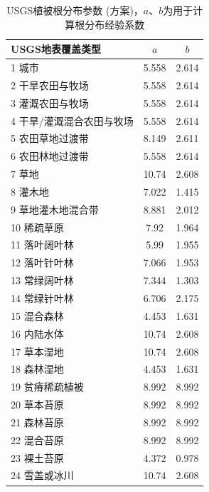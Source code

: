 \begin{table}[htbp]
\centering
\caption[USGS植被根分布参数 (\citet{zeng2001global}方案)]{USGS植被根分布参数 (\citet{zeng2001global}方案)，$a$、$b$为用于计算根分布经验系数}
\label{tab:USGS植被根分布参数}
\begin{tabular}{@{}lcc@{}}
\toprule
USGS地表覆盖类型     & $a$ & $b$ \\ \midrule
1 城市           & 5.558      & 2.614      \\
2 干旱农田与牧场      & 5.558      & 2.614      \\
3 灌溉农田与牧场      & 5.558      & 2.614      \\
4 干旱/灌溉混合农田与牧场 & 5.558      & 2.614      \\
5 农田草地过渡带      & 8.149      & 2.611      \\
6 农田林地过渡带      & 5.558      & 2.614      \\
7 草地           & 10.74      & 2.608      \\
8 灌木地          & 7.022      & 1.415      \\
9 草地灌木地混合带     & 8.881      & 2.012      \\
10 稀疏草原        & 7.92       & 1.964      \\
11 落叶阔叶林       & 5.99       & 1.955      \\
12 落叶针叶林       & 7.066      & 1.953      \\
13 常绿阔叶林       & 7.344      & 1.303      \\
14 常绿针叶林       & 6.706& 2.175      \\
15 混合森林        & 4.453      & 1.631      \\
16 内陆水体        & 10.74      & 2.608      \\
17 草本湿地        & 10.74      & 2.608      \\
18 森林湿地        & 4.453      & 1.631      \\
19 贫瘠稀疏植被      & 8.992      & 8.992      \\
20 草本苔原        & 8.992      & 8.992      \\
21 森林苔原        & 8.992      & 8.992      \\
22 混合苔原        & 8.992      & 8.992      \\
23 裸土苔原        & 4.372      & 0.978      \\
24 雪盖或冰川       & 10.74      & 2.608      \\ \bottomrule
\end{tabular}
\end{table}


